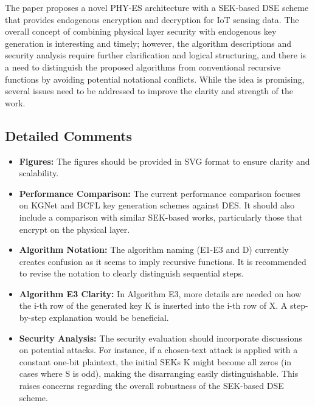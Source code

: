 \documentclass[a4paper]{article}
\begin{document}
The paper proposes a novel PHY-ES architecture with a SEK-based DSE scheme that provides endogenous encryption and decryption for IoT sensing data. The overall concept of combining physical layer security with endogenous key generation is interesting and timely; however, the algorithm descriptions and security analysis require further clarification and logical structuring, and there is a need to distinguish the proposed algorithms from conventional recursive functions by avoiding potential notational conflicts. While the idea is promising, several issues need to be addressed to improve the clarity and strength of the work.

\subsection{Detailed Comments}

\begin{itemize}
  \item \textbf{Figures:} The figures should be provided in SVG format to ensure clarity and scalability.
  \item \textbf{Performance Comparison:} The current performance comparison focuses on KGNet and BCFL key generation schemes against DES. It should also include a comparison with similar SEK-based works, particularly those that encrypt on the physical layer.
  \item \textbf{Algorithm Notation:} The algorithm naming (E1-E3 and D) currently creates confusion as it seems to imply recursive functions. It is recommended to revise the notation to clearly distinguish sequential steps.
  \item \textbf{Algorithm E3 Clarity:} In Algorithm E3, more details are needed on how the i-th row of the generated key K is inserted into the i-th row of X. A step-by-step explanation would be beneficial.
  \item \textbf{Security Analysis:} The security evaluation should incorporate discussions on potential attacks. For instance, if a chosen-text attack is applied with a constant one-bit plaintext, the initial SEKs K might become all zeros (in cases where S is odd), making the disarranging easily distinguishable. This raises concerns regarding the overall robustness of the SEK-based DSE scheme.
\end{itemize}

% 
\end{document}
